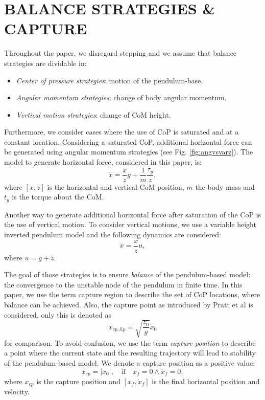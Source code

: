 \documentclass[letterpaper, 10 pt, conference]{ieeeconf}  %
\begin{document}
\section{BALANCE STRATEGIES \& CAPTURE}\label{sec:models}
Throughout the paper, we disregard stepping and we assume that balance strategies are dividable in:
\begin{itemize}
	\item \textit{Center of pressure strategies}: motion of the pendulum-base.
	\item \textit{Angular momentum strategies}: change of body angular momentum.
	\item \textit{Vertical motion strategies}: change of CoM height.
\end{itemize}
Furthermore, we consider cases where the use of CoP is saturated and at a constant location. Considering a saturated CoP, additional horizontal force can be generated using angular momentum strategies (see Fig. \ref{fig:angvsvarz}). The model to generate horizontal force, considered in this paper, is:
\begin{equation}
	\ddot{x} =\frac{x}{z}g + \frac{1}{m}\frac{\tau_y}{z},
	\label{eq:ang}
\end{equation}
where $[x,z]$ is the horizontal and vertical CoM position, $m$ the body mass and $t_y$ is the torque about the CoM.

Another way to generate additional horizontal force after saturation of the CoP is the use of vertical motion. To consider vertical motions, we use a variable height inverted pendulum model and the following dynamics are considered:
\begin{equation}
	\ddot{x} = \frac{x}{z}u,
	\label{eq:height}
\end{equation}
where $u=g+\ddot{z}$.

The goal of those strategies is to ensure \textit{balance} of the pendulum-based model: the convergence to the unstable node of the pendulum in finite time. In this paper, we use the term capture region \cite{pratt2006capture} to describe the set of CoP locations, where balance can be achieved. Also, the capture point as introduced by Pratt et al is considered, only this is denoted as
\begin{equation}
	x_{cp,lip} = \sqrt{\frac{z_0}{g}}\dot{x}_0
\end{equation}
for comparison. To avoid confusion, we use the term \textit{capture position} to describe a point where the current state and the resulting trajectory will lead to stability of the pendulum-based model. We denote a capture position as a positive value:
\begin{equation}
	x_{cp}= |x_0|,\quad \text{if} \quad x_f=0 \wedge \dot{x}_f=0,
	\label{eq:xcp}
\end{equation}
where $x_{cp}$ is the capture position and $[x_f, \dot{x}_f]$ is the final horizontal position and velocity.
\end{document}
